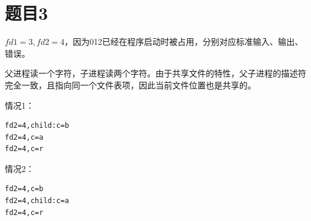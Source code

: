 \documentclass[fleqn]{ctexart}
\begin{document}
\section*{题目3}
$fd1=3,fd2=4$，因为012已经在程序启动时被占用，分别对应标准输入、输出、错误。

父进程读一个字符，子进程读两个字符。由于共享文件的特性，父子进程的描述符完全一致，且指向同一个文件表项，因此当前文件位置也是共享的。

情况1：
\begin{verbatim}
fd2=4,child:c=b
fd2=4,c=a
fd2=4,c=r
\end{verbatim}

情况2：
\begin{verbatim}
fd2=4,c=b
fd2=4,child:c=a
fd2=4,c=r
\end{verbatim}
\end{document}
